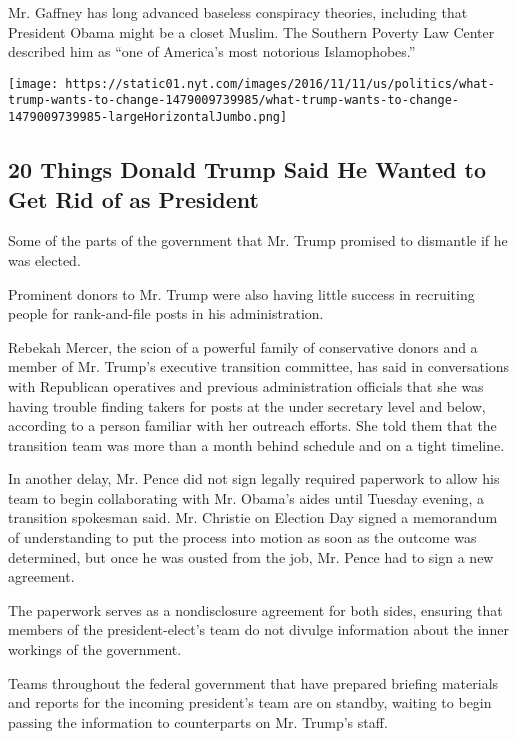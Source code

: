 Mr. Gaffney has long advanced baseless conspiracy theories, including
that President Obama might be a closet Muslim. The Southern Poverty Law
Center described him as ``one of America's most notorious
Islamophobes.''

\href{https://www.nytimes.com/interactive/2016/11/11/us/politics/what-trump-wants-to-change.html}{}

\texttt{[image: https://static01.nyt.com/images/2016/11/11/us/politics/what-trump-wants-to-change-1479009739985/what-trump-wants-to-change-1479009739985-largeHorizontalJumbo.png]}

\hypertarget{20-things-donald-trump-said-he-wanted-to-get-rid-of-as-president}{%
\subsection{20 Things Donald Trump Said He Wanted to Get Rid of as
President}\label{20-things-donald-trump-said-he-wanted-to-get-rid-of-as-president}}

Some of the parts of the government that Mr. Trump promised to dismantle
if he was elected.

Prominent donors to Mr. Trump were also having little success in
recruiting people for rank-and-file posts in his administration.

Rebekah Mercer, the scion of a powerful family of conservative donors
and a member of Mr. Trump's executive transition committee, has said in
conversations with Republican operatives and previous administration
officials that she was having trouble finding takers for posts at the
under secretary level and below, according to a person familiar with her
outreach efforts. She told them that the transition team was more than a
month behind schedule and on a tight timeline.

In another delay, Mr. Pence did not sign legally required paperwork to
allow his team to begin collaborating with Mr. Obama's aides until
Tuesday evening, a transition spokesman said. Mr. Christie on Election
Day signed a memorandum of understanding to put the process into motion
as soon as the outcome was determined, but once he was ousted from the
job, Mr. Pence had to sign a new agreement.

The paperwork serves as a nondisclosure agreement for both sides,
ensuring that members of the president-elect's team do not divulge
information about the inner workings of the government.

Teams throughout the federal government that have prepared briefing
materials and reports for the incoming president's team are on standby,
waiting to begin passing the information to counterparts on Mr. Trump's
staff.

